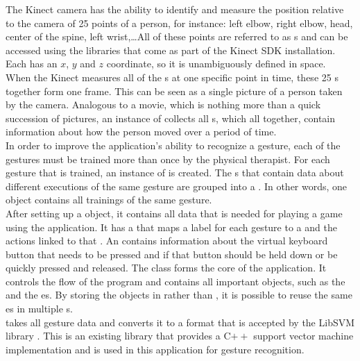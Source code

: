 The Kinect camera has the ability to identify and measure the position relative to the camera of 25 points of a person, for instance: left elbow, right elbow, head, center of the spine, left wrist,\ldots All of these points are referred to as s and can be accessed using the libraries that come as part of the Kinect SDK installation. Each  has an $x$, $y$ and $z$ coordinate, so it is unambiguously defined in space.\\

When the Kinect measures all of the s at one specific point in time, these 25 s together form one frame. This can be seen as a single picture of a person taken by the camera. Analogous to a movie, which is nothing more than a quick succession of pictures, an instance of  collects all s, which all together, contain information about how the person moved over a period of time.\\

In order to improve the application's ability to recognize a gesture, each of the gestures must be trained more than once by the physical therapist. For each gesture that is trained, an instance of  is created. The s that contain data about different executions of the same gesture are grouped into a . In other words, one  object contains all trainings of the same gesture.\\

After setting up a  object, it contains all data that is needed for playing a game using the application. It has a  that maps a label for each gesture to a  and the actions linked to that . An  contains information about the virtual keyboard button that needs to be pressed and if that button should be held down or be quickly pressed and released. The  class forms the core of the application. It controls the flow of the program and contains all important objects, such as the  and the es. By storing the  objects in  rather than , it is possible to reuse the same es in multiple s.\\

 takes all gesture data and converts it to a format that is accepted by the LibSVM library \cite{LibSVM}. This is an existing library that provides a C$++$ support vector machine implementation and is used in this application for gesture recognition.\\

